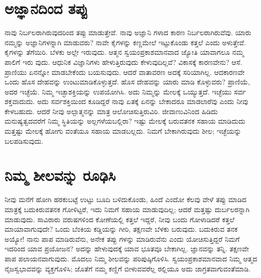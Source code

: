\section{ಅಜ್ಞಾನದಿಂದ ತಪ್ಪು}

ನಾವು ನಿರ್ಬಲರಾಗಿರುವುದರಿಂದ ತಪ್ಪು ಮಾಡುತ್ತೇವೆ. ನಾವು ಅಜ್ಞಾನಿ ಗಳಾದ ಕಾರಣ ನಿರ್ಬಲರಾಗಿರುವೆವು. ಯಾರು ನಮ್ಮನ್ನು ಅಜ್ಞಾನಿಗಳನ್ನಾಗಿ ಮಾಡುವರು? ನಾವೇ ಕೈಗಳನ್ನು ಕಣ್ಣಮೇಲೆ ಇಟ್ಟುಕೊಂಡು ಕತ್ತಲೆ ಎಂದು ಅಳುತ್ತೇವೆ. ಕೈಗಳನ್ನು ತೆಗೆಯಿರಿ. ಬೆಳಕು ಅಲ್ಲೇ ಇರುವುದು. ಆತ್ಮನ ಸ್ವಯಂಪ್ರಕಾಶಮಾನವಾದ ಜ್ಯೋತಿ ಯಾವಾಗಲೂ ನಮ್ಮ ಪಾಲಿಗೆ ಇರು ವುದು. ಆಧುನಿಕ ವಿಜ್ಞಾನಿಗಳು ಹೇಳುತ್ತಿರುವುದು ಕೇಳುವುದಿಲ್ಲವೆ? ವಿಕಾಸಕ್ಕೆ ಕಾರಣವೇನು? ಆಸೆ. ಪ್ರಾಣಿಯು ಏನನ್ನೋ ಮಾಡಬೇಕೆಂದು ಬಯಸುವುದು. ಆದರೆ ವಾತಾವರಣ ಅದಕ್ಕೆ ಸರಿಯಾಗಿಲ್ಲ. ಆದಕಾರಣವೇ ಒಂದು ಹೊಸ ದೇಹವನ್ನು ಉಂಟುಮಾಡಿಕೊಳ್ಳುತ್ತದೆ. ಹೊಸ ದೇಹವನ್ನು ಯಾರು ಮಾಡಿ ಕೊಳ್ಳುವರು? ಪ್ರಾಣಿಯೆ, ಅದರ ಇಚ್ಛೆಯೆ. ನಿಮ್ಮ ಇಚ್ಛಾಶಕ್ತಿಯನ್ನು ಉಪಯೋಗಿಸಿ. ಅದು ನಿಮ್ಮನ್ನು ಮೇಲಕ್ಕೆ ಒಯ್ಯುತ್ತದೆ. ಇಚ್ಛೆಯು ಸರ್ವ ಶಕ್ತವಾದುದು. ಅದು ಸರ್ವಶಕ್ತಿಯಿಂದ ಕೂಡಿದ್ದರೆ ನಾವು ಏತಕ್ಕೆ ಏನನ್ನು ಬೇಕಾದರೂ ಮಾಡಲಾರೆವು ಎಂದು ನೀವು ಕೇಳಬಹುದು. ಆದರೆ ನೀವು ಅಲ್ಪಾತ್ಮನನ್ನು ಮಾತ್ರ ಆಲೋಚಿಸುತ್ತಿರುವಿರಿ. ಜೀವಾಣುವಿನಿಂದ ಹಿಡಿದು ಮನುಷ್ಯತ್ವದವರೆಗೆ ನಿಮ್ಮ ಸ್ಥಿತಿಯನ್ನು ಅಲ್ಲಗಳೆಯಬಲ್ಲಿರಾ? ಇಷ್ಟು ಮೇಲಕ್ಕೆ ಬರುವತನಕ ಸಹಾಯ ಮಾಡಿದುದು ಮತ್ತಷ್ಟು ಮೇಲಕ್ಕೆ ಹೋಗು ವಂತೆಯೂ ಸಹಾಯ ಮಾಡಬಲ್ಲದು. ನಿಮಗೆ ಬೇಕಾಗಿರುವುದು ಶೀಲ; ಇಚ್ಛೆಯನ್ನು ಬಲಪಡಿಸುವುದು.


\section{ನಿಮ್ಮ ಶೀಲವನ್ನು ರೂಢಿಸಿ}

ನೀವು ಮನೆಗೆ ಹೋಗಿ ಹರಕುಬಟ್ಟೆ ಉಟ್ಟು ಬೂದಿ ಬಳಿದುಕೊಂಡು, ಹಿಂದೆ ಎಂದೋ ಕೆಲವು ವೇಳೆ ತಪ್ಪು ಮಾಡಿದ ಮಾತ್ರಕ್ಕೆ ಬದುಕಿರುವತನಕ ಗೋಳಿಟ್ಟರೆ, ಇದು ನಿಮಗೆ ಸಹಾಯ ಮಾಡುವುದಿಲ್ಲ; ಆದರೆ ಮತ್ತಷ್ಟು ದುರ್ಬಲರನ್ನಾಗಿ ಮಾಡುವುದು. ಸಾವಿರಾರು ವರುಷಗಳಿಂದ ಕೋಣೆಯಲ್ಲಿ ಕತ್ತಲೆ ಇದ್ದರೆ, ನೀವು ಬಂದು ಗೋಳಾಡಿದರೆ ಕತ್ತಲೆ ಮಾಯಾವಾಗುವುದೇ? ಒಂದು ಬೆಂಕಿಯ ಕಡ್ಡಿಯನ್ನು ಗೀರಿ, ತಕ್ಷಣವೇ ಬೆಳಕು ಬರುವುದು. ಬದುಕಿರುವ ತನಕ ಅಯ್ಯೋ! ನಾನು ಪಾಪ ಮಾಡಿರುವೆನು, ಅನೇಕ ತಪ್ಪು ಗಳನ್ನು ಮಾಡಿರುವೆನು ಎಂದು ಯೋಚಿಸುತ್ತಿದ್ದರೆ ನಿಮಗೆ ಇದರಿಂದ ಯಾವ ಪ್ರಯೋಜನ? ಅದನ್ನು ಹೇಳುವುದಕ್ಕೆ ಯಾವ ಭೂತವೂ ಬೇಕಾಗಿಲ್ಲ. ಜ್ಞಾನವನ್ನು ತನ್ನಿ. ತಕ್ಷಣವೇ ಪಾಪ ಪಲಾಯನವಾಗುವುದು. ಮೊದಲು ನಿಮ್ಮ ಶೀಲವನ್ನು ಪರಿಪುಷ್ಠಿಗೊಳಿಸಿ. ಸ್ವಯಂಪ್ರಕಾಶಮಾನವಾದ ನಿಮ್ಮ ಆತ್ಮದ ನೈಜಸ್ವಭಾವವನ್ನು ವ್ಯಕ್ತಗೊಳಿಸಿ; ಜೊತೆಗೆ ನಮ್ಮ ಕಣ್ಣಿಗೆ ಬೀಳುವವರೆಲ್ಲ ರಲ್ಲಿಯೂ ಅದು ಜಾಗ್ರತವಾಗುವಂತೆಮಾಡಿ.

